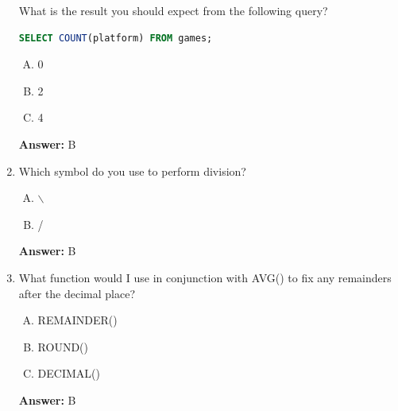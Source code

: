 \documentclass[12pt]{article}
\begin{document}
\begin{enumerate}[1.]
    What is the result you should expect from the following query?

    \bigskip

    \begin{lstlisting}[language=SQL]
    SELECT COUNT(platform) FROM games;
    \end{lstlisting}

    \bigskip

    \begin{enumerate}[A.]
        \item 0
        \item 2
        \item 4

    \end{enumerate}

    \bigskip

    \textbf{Answer:} B

    \item

    Which symbol do you use to perform division?

    \bigskip

    \begin{enumerate}[A.]
        \item $\backslash$
        \item /
    \end{enumerate}

    \bigskip

    \textbf{Answer:} B

    \item

    What function would I use in conjunction with AVG() to fix any remainders after the decimal place?

    \bigskip

    \begin{enumerate}[A.]
        \item REMAINDER()
        \item ROUND()
        \item DECIMAL()
    \end{enumerate}

    \bigskip

    \textbf{Answer:} B



\end{enumerate}
\end{document}
